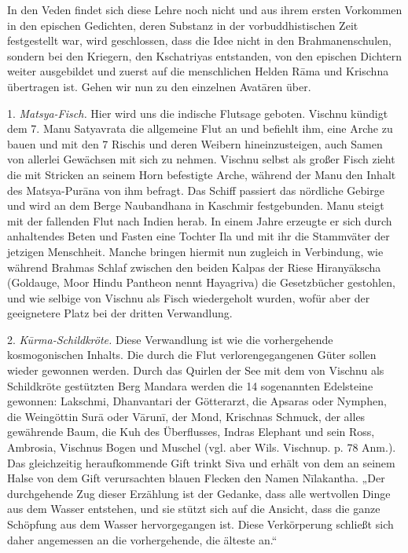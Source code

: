 \documentclass{article}
\begin{document}
In den Veden findet sich diese Lehre noch nicht und aus ihrem ersten Vorkommen in den epischen Gedichten, deren Substanz in der vorbuddhistischen Zeit festgestellt war, wird geschlossen, dass die Idee nicht in den Brahmanenschulen, sondern bei den Kriegern, den Kschatriyas entstanden, von den epischen Dichtern weiter ausgebildet und zuerst auf die menschlichen Helden R\={a}ma und Krischna übertragen ist. Gehen wir nun zu den einzelnen Avat\={a}ren über.

1. \emph{Matsya-Fisch.} Hier wird uns die indische Flutsage geboten. Vischnu kündigt dem 7. Manu Satyavrata die allgemeine Flut an und befiehlt ihm, eine Arche zu bauen und mit den 7 Rischis und deren Weibern hineinzusteigen, auch Samen von allerlei Gewächsen mit sich zu nehmen. Vischnu selbst als großer Fisch zieht die mit Stricken an seinem Horn befestigte Arche, während der Manu den Inhalt des Matsya-Pur\={a}na von ihm befragt. Das Schiff passiert das nördliche Gebirge und wird an dem Berge Naubandhana in Kaschmir festgebunden. Manu steigt mit der fallenden Flut nach Indien herab. In einem Jahre erzeugte er sich durch anhaltendes Beten und Fasten eine Tochter Ila und mit ihr die Stammväter der jetzigen Menschheit. Manche bringen hiermit nun zugleich in Verbindung, wie während Brahmas Schlaf zwischen den beiden Kalpas der Riese Hirany\={a}kscha (Goldauge, Moor Hindu Pantheon nennt Hayagriva) die Gesetzbücher gestohlen, und wie selbige von Vischnu als Fisch wiedergeholt wurden, wofür aber der geeignetere Platz bei der dritten Verwandlung.

2. \emph{K\={u}rma-Schildkröte.} Diese Verwandlung ist wie die vorhergehende kosmogonischen Inhalts. Die durch die Flut verlorengegangenen Güter sollen wieder gewonnen werden. Durch das Quirlen der See mit dem von Vischnu als Schildkröte gestützten Berg Mandara werden die 14 sogenannten Edelsteine gewonnen: Lakschmi, Dhanvantari der Götterarzt, die Apsaras oder Nymphen, die Weingöttin Sur\={a} oder V\={a}run\={i}, der Mond, Krischnas Schmuck, der alles gewährende Baum, die Kuh des Überflusses, Indras Elephant und sein Ross, Ambrosia, Vischnus Bogen und Muschel (vgl. aber Wils. Vischnup. p. 78 Anm.). Das gleichzeitig heraufkommende Gift trinkt Siva und erhält von dem an seinem Halse von dem Gift verursachten blauen Flecken den Namen N\={i}lakantha. „Der durchgehende Zug dieser Erzählung ist der Gedanke, dass alle wertvollen Dinge aus dem Wasser entstehen, und sie stützt sich auf die Ansicht, dass die ganze Schöpfung aus dem Wasser hervorgegangen ist. Diese Verkörperung schließt sich daher angemessen an die vorhergehende, die älteste an.“
\end{document}
